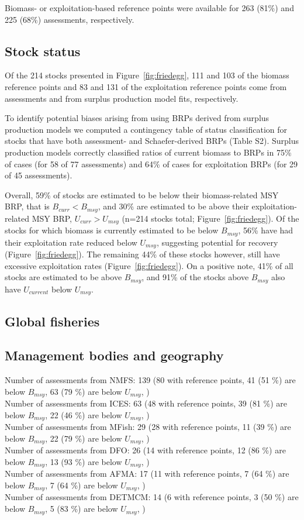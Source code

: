Biomass- or exploitation-based reference points were available for
263 (81\%) and
225 (68\%)
assessments, respectively.

\subsection*{Stock status}
\noindent
Of the
214 stocks presented in
Figure~\ref{fig:friedegg}, 111 and
103 of the biomass reference points and
83 and
131 of the exploitation reference
points come from assessments and from surplus production model fits,
respectively.

To identify potential biases arising from using BRPs
derived from surplus production models we computed a contingency table
of status classification for stocks that have both assessment- and
Schaefer-derived BRPs (Table S2). Surplus production models correctly
classified ratios of current biomass to BRPs in
75\% of cases (for 58
of 77 assessments) and 64\%
of cases for exploitation BRPs (for 29 of
45 assessments).

Overall, 59\% of stocks are estimated
to be below their biomass-related MSY BRP, that is $B_{curr}<B_{msy}$,
and 30\% are estimated to be above
their exploitation-related MSY BRP, $U_{curr}>U_{msy}$
(n=214 stocks total; Figure~\ref{fig:friedegg}).
Of the stocks for which biomass is currently estimated to be below
$B_{msy}$, 56\% have had their
exploitation rate reduced below $U_{msy}$, suggesting potential for
recovery (Figure~\ref{fig:friedegg}). The remaining
44\% of these stocks however,
still have excessive exploitation rates
(Figure~\ref{fig:friedegg}). On a positive note,
41\% of all stocks are estimated to
be above $B_{msy}$, and 91\%
of the stocks above $B_{msy}$ also have $U_{current}$ below $U_{msy}$.


\subsection*{Global fisheries}

\subsection*{Management bodies and geography}
\noindent
Number of assessments from NMFS: 139 (80 with reference points, 41 (51 \%) are below $B_{msy}$, 63 (79 \%) are below $U_{msy}$, ) \\
Number of assessments from ICES: 63 (48 with reference points, 39 (81 \%) are below $B_{msy}$, 22 (46 \%) are below $U_{msy}$, ) \\
Number of assessments from MFish: 29 (28 with reference points, 11 (39 \%) are below $B_{msy}$, 22 (79 \%) are below $U_{msy}$, ) \\
Number of assessments from DFO: 26 (14 with reference points, 12 (86 \%) are below $B_{msy}$, 13 (93 \%) are below $U_{msy}$, ) \\
Number of assessments from AFMA: 17 (11 with reference points, 7 (64 \%) are below $B_{msy}$, 7 (64 \%) are below $U_{msy}$, ) \\
Number of assessments from DETMCM: 14 (6 with reference points, 3 (50 \%) are below $B_{msy}$, 5 (83 \%) are below $U_{msy}$, ) \\

